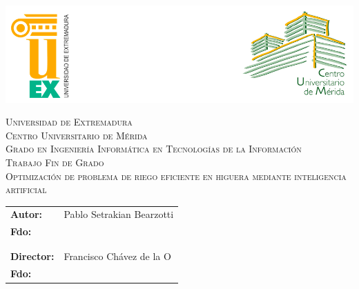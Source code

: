 \pagestyle{empty}

\begin{center}
	\newcommand{\HRule}{\rule{\linewidth}{0.7mm}}
	\begin{center}
            \includegraphics[width=\columnwidth, keepaspectratio]{images/logo.png}\\
        \end{center}
	
	\vspace*{2cm}
	\textsc{\large Universidad de Extremadura}\\[0.5cm]
	\textsc{\large Centro Universitario de Mérida}\\[1.3cm]
	\textsc{\LARGE Grado en Ingeniería Informática en Tecnologías de la Información}\\[1.3cm]
	\textsc{\huge Trabajo Fin de Grado}\\[2 cm]
	\textsc{\LARGE Optimización de problema de riego eficiente en higuera mediante inteligencia artificial}\\[1.5 cm]

\end{center}

\begin{flushleft}
	\begin{tabular}{ll}
		\large{\textbf{Autor:}}	&
		\large{Pablo Setrakian Bearzotti} \\
		\large{\textbf{Fdo:}} & \\
		\\
		\\
		\large{\textbf{Director:}}	&
		\large{Francisco Chávez de la O} \\
		\large{\textbf{Fdo:}} & \\
	\end{tabular}
\end{flushleft}
